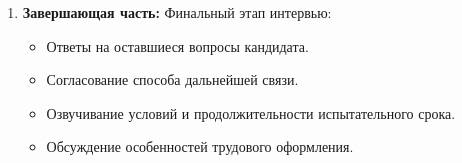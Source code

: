 \documentclass[14pt, russian]{matmex-diploma-custom}
\begin{document}
\begin{enumerate}
    \item \textbf{Завершающая часть:}
    Финальный этап интервью:
    \begin{itemize}
        \item Ответы на оставшиеся вопросы кандидата.
        \item Согласование способа дальнейшей связи.
        \item Озвучивание условий и продолжительности испытательного срока.
        \item Обсуждение особенностей трудового оформления.
    \end{itemize}
\end{enumerate}
\end{document}
